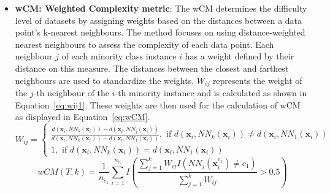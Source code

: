 \documentclass{article}
\begin{document}
\begin{itemize}
 \item \textbf{wCM: Weighted Complexity metric}: The wCM determines the difficulty level of datasets by assigning weights based on the distances between a data point's k-nearest neighbours. The method focuses on using distance-weighted nearest neighbours to assess the complexity of each data point. 
 Each neighbour $j$ of each minority class instance $i$ has a weight defined by their distance on this measure. The distances between the closest and farthest neighbours are used to standardize the weights. $W_{i j}$ represents the weight of the $j$-th neighbour of the $i$-th minority instance and is calculated as shown in Equation~\autoref{eq:wij1}. These weights are then used for the calculation of wCM as displayed in Equation~\autoref{eq:wCM}.
 \begin{equation}\label{eq:wij1}
     W_{i j}=\left\{\begin{array}{l}
\frac{d\left(\mathbf{x}_{i}, N N_{k}\left(\mathbf{x}_{i}\right)\right)-d\left(\mathbf{x}_{i}, N N_{j}\left(\mathbf{x}_{i}\right)\right)}{d\left(\mathbf{x}_{i}, N N_{k}\left(\mathbf{x}_{i}\right)\right)-d\left(\mathbf{x}_{i}, N N_{1}\left(\mathbf{x}_{i}\right)\right)}, \text { if } d\left(\mathbf{x}_{i}, N N_{k}\left(\mathbf{x}_{i}\right)\right) \neq d\left(\mathbf{x}_{i}, N N_{1}\left(\mathbf{x}_{i}\right)\right) \\
1, \text { if } d\left(\mathbf{x}_{i}, N N_{k}\left(\mathbf{x}_{i}\right)\right)=d\left(\mathbf{x}_{i}, N N_{1}\left(\mathbf{x}_{i}\right)\right)
\end{array}\right.
 \end{equation}
 \begin{equation}\label{eq:wCM}
     w C M(T, k)=\frac{1}{n_{c_{1}}} \sum_{i=1}^{n_{c_{i}}} I\left(\frac{\sum_{j=1}^{k} W_{i j} I\left(N N_{j}\left(\mathbf{x}_{i}^{c_{1}}\right) \neq c_{1}\right)}{\sum_{j=1}^{k} W_{i j}}>0.5\right)
 \end{equation}
 

\end{itemize}
\end{document}
